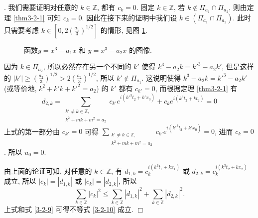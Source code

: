 \documentclass[master]{cugthesis}
\newcommand\Z{\ensuremath{\mathbb{Z}}}
\newenvironment{proof}{{\noindent\itshape 证明}.}{\hfill $\Box$\par}
\begin{document}
\begin{proof}
      我们需要证明对任意的 $k\in\Z$, 都有 $c_k=0$. 固定 $k\in \Z$, 若 $k\notin \Pi_{a_1}\cap \Pi_{a_2}$, 则由定理 \ref{thm3-2-1} 可知 $c_k=0$. 因此在接下来的证明中我们设 $k\in  \left(\Pi_{a_1}\cap \Pi_{a_2}\right)$. 此时只需要考虑 $k\in \left[0, 2\left(\frac{a_1}{3}\right)^{1 /2}\right]$ 的情形, 见图 \ref{fig6}.
          \begin{figure}[ht]
        \centering
        \caption{函数$y=x^3-a_1x$ 和 $y=x^3-a_2 x$ 的图像.}
        \label{fig6}
    \end{figure}
     因为 $k\in \Pi_{a_2} $, 所以必然存在另一个不同的 $k'$ 使得 $k^3-a_2k={k'}^3-a_2k'$, 但是这样的 $|k'|\ge\left(\frac{a_2}{3}\right)^{1 /2}>2\left(\frac{a_2}{3}\right)^{1 /2}$, 所以 $k'\notin \Pi_{a_1}$. 这说明使得 $k^3-a_2k=k'^3-a_2k'$ (或等价地, $k^2+k'k+k'^2=a_2$) 的 $k'$ 都有 $c_{k'}=0$, 而根据定理 \ref{thm3-2-1} 有
     \begin{equation*}
         d_{2,k}=\sum\limits_{\substack{k'\neq k\in \Z,\\ k^2+mk+m^2=a_2}} c_{k'}e^{i(k'^3t_2+k'x_0)}+c_k e^{i(k^3t_2+kt_2)}=0
     \end{equation*}
     上式的第一部分由 $c_{k'}=0$ 可得 $\sum_{\substack{k'\neq k\in \Z,\\ k^2+mk+m^2=a_2}} c_{k'}e^{i(k'^3t_2+k'x_0)}=0$, 进而 $c_k=0$. 所以 $u_0=0$.
  
  由上面的论证可知, 对任意的 $k\in \Z$, 有 $d_{1,k}=c_k^{i(k^3t_1+kx_1)}$ 或 $d_{2,k}=c_k^{i(k^3t_2+kx_2)}$ 成立, 所以 $|c_k|=|d_{1,k}|$ 或 $|c_k|=|d_{2,k}|$, 所以
  \begin{equation*}
      \sum_{k\in \Z}|c_k|^2\le \sum_{k\in \Z}|d_{1,k}|^2+\sum_{k\in\Z}|d_{2,k}|^2.
  \end{equation*}
  上式和式 \eqref{3-2-9} 可得不等式 \eqref{3-2-10} 成立.   
      \end{proof}
    
\end{document}
